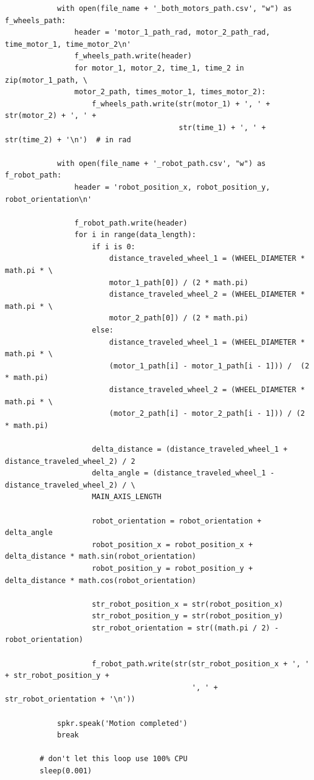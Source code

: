 {\begin{verbatim}
            with open(file_name + '_both_motors_path.csv', "w") as f_wheels_path:
                header = 'motor_1_path_rad, motor_2_path_rad, time_motor_1, time_motor_2\n'
                f_wheels_path.write(header)
                for motor_1, motor_2, time_1, time_2 in zip(motor_1_path, \ 
                motor_2_path, times_motor_1, times_motor_2):
                    f_wheels_path.write(str(motor_1) + ', ' + str(motor_2) + ', ' +
                                        str(time_1) + ', ' + str(time_2) + '\n')  # in rad
    
            with open(file_name + '_robot_path.csv', "w") as f_robot_path:
                header = 'robot_position_x, robot_position_y, robot_orientation\n'
    
                f_robot_path.write(header)
                for i in range(data_length):
                    if i is 0:
                        distance_traveled_wheel_1 = (WHEEL_DIAMETER * math.pi * \
                        motor_1_path[0]) / (2 * math.pi)
                        distance_traveled_wheel_2 = (WHEEL_DIAMETER * math.pi * \
                        motor_2_path[0]) / (2 * math.pi)
                    else:
                        distance_traveled_wheel_1 = (WHEEL_DIAMETER * math.pi * \
                        (motor_1_path[i] - motor_1_path[i - 1])) /  (2 * math.pi)
                        distance_traveled_wheel_2 = (WHEEL_DIAMETER * math.pi * \
                        (motor_2_path[i] - motor_2_path[i - 1])) / (2 * math.pi)
    
                    delta_distance = (distance_traveled_wheel_1 + distance_traveled_wheel_2) / 2
                    delta_angle = (distance_traveled_wheel_1 - distance_traveled_wheel_2) / \
                    MAIN_AXIS_LENGTH
    
                    robot_orientation = robot_orientation + delta_angle
                    robot_position_x = robot_position_x + delta_distance * math.sin(robot_orientation)
                    robot_position_y = robot_position_y + delta_distance * math.cos(robot_orientation)
    
                    str_robot_position_x = str(robot_position_x)
                    str_robot_position_y = str(robot_position_y)
                    str_robot_orientation = str((math.pi / 2) - robot_orientation)
    
                    f_robot_path.write(str(str_robot_position_x + ', ' + str_robot_position_y +
                                           ', ' + str_robot_orientation + '\n'))
    
            spkr.speak('Motion completed')
            break
    
        # don't let this loop use 100% CPU
        sleep(0.001)
    
    \end{verbatim}
    }
    
